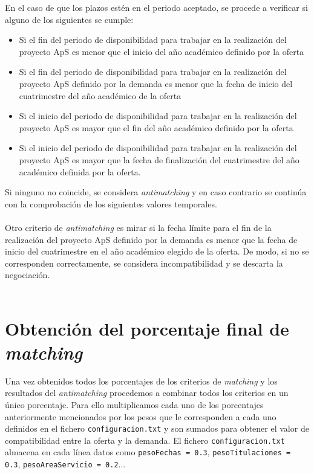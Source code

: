 \documentclass[11pt]{book}
\begin{document}
	En el caso de que los plazos estén en el periodo aceptado, se procede a verificar si alguno de los siguientes se cumple:
	\begin{itemize}
		\item Si el fin del periodo de disponibilidad para trabajar en la realización del proyecto ApS es menor que el inicio del año académico definido por la oferta
		\item Si el fin del periodo de disponibilidad para trabajar en la realización del
		proyecto ApS definido por la demanda es menor que la fecha de inicio del cuatrimestre del año académico de la oferta 
		\item Si el inicio del periodo de disponibilidad para trabajar en la realización del
		proyecto ApS es mayor que el fin del año académico definido por la oferta 
		\item Si el inicio del periodo de disponibilidad para trabajar en la realización del
		proyecto ApS es mayor que la fecha de finalización del cuatrimestre del año académico definida por la oferta.\\
	\end{itemize}
	Si ninguno no coincide, se considera \emph{antimatching} y en caso contrario se continúa con la comprobación de los siguientes valores temporales.\\\\
	
	Otro criterio de \emph{antimatching} es mirar si la fecha límite para el fin de la realización del proyecto ApS definido por la demanda es menor que la fecha de inicio del cuatrimestre en el año académico elegido de la oferta. De modo, si no se corresponden correctamente, se considera incompatibilidad y se descarta la negociación. \\\\
	
	
	
	\section{Obtención del porcentaje final de \textit{matching}}
	
	Una vez obtenidos todos los porcentajes de los criterios de \emph{matching} y los resultados del \emph{antimatching} procedemos a combinar todos los criterios en un único porcentaje. Para ello multiplicamos cada uno de los porcentajes anteriormente mencionados por los pesos que le corresponden a cada uno definidos en el fichero \texttt{configuracion.txt} y son sumados para obtener el valor de compatibilidad entre la oferta y la demanda. El fichero \texttt{configuracion.txt} almacena en cada línea datos como \texttt{pesoFechas = 0.3}, \texttt{pesoTitulaciones = 0.3}, \texttt{pesoAreaServicio = 0.2}...  \\\\
	
\end{document}
